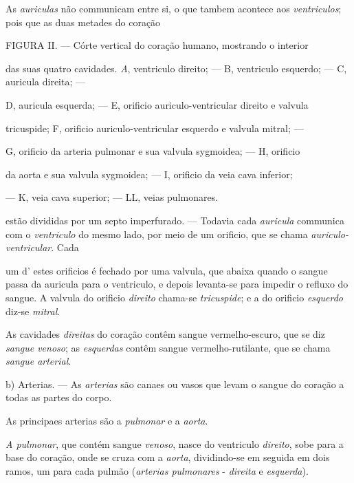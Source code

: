 As \emph{auriculas} não communicam entre si, o que tambem acontece aos \emph{ventriculos}; pois que as duas metades do coração

FIGURA II. --- Córte vertical do coração humano, mostrando o interior

das suas quatro cavidades. \emph{A}, ventriculo direito; --- B, ventriculo esquerdo; --- C, auricula direita; ---

D, auricula esquerda; --- E, orificio auriculo-ventricular direito e valvula

tricuspide; F, orificio auriculo-ventricular esquerdo e valvula mitral; ---

G, orificio da arteria pulmonar e sua valvula sygmoidea; --- H, orificio

da aorta e sua valvula sygmoidea; --- I, orificio da veia cava inferior;

--- K, veia cava superior; --- LL, veias pulmonares.

estão divididas por um septo imperfurado. --- Todavia cada \emph{auricula} communica com o \emph{ventriculo} do mesmo lado, por meio de um orificio, que se chama \emph{auriculo-ventricular}. Cada

um d' estes orificios é fechado por uma valvula, que abaixa quando o sangue passa da auricula para o ventriculo, e depois levanta-se para impedir o refluxo do sangue. A valvula do orificio \emph{direito} chama-se \emph{tricuspide}; e a do orificio \emph{esquerdo} diz-se \emph{mitral}.

As cavidades \emph{direitas} do coração contêm sangue vermelho-escuro, que se diz \emph{sangue venoso}; as \emph{esquerdas} contêm sangue vermelho-rutilante, que se chama \emph{sangue arterial}.

b) Arterias. --- As \emph{arterias} são canaes ou vasos que levam o sangue do coração a todas as partes do corpo.

As principaes arterias são a \emph{pulmonar} e a \emph{aorta}.

\emph{A pulmonar}, que contém sangue \emph{venoso}, nasce do ventriculo \emph{direito}, sobe para a base do coração, onde se cruza com a \emph{aorta}, dividindo-se em seguida em dois ramos, um para cada pulmão (\emph{arterias pulmonares} - \emph{direita} e \emph{esquerda}).


